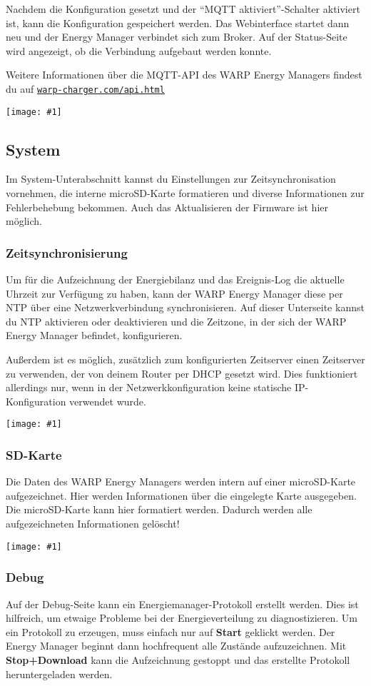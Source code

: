 \documentclass[a4paper,10pt]{article}
\newcommand{\gfx}[1]{\texttt{[image: \#1]}}
\newcommand\rurl[2]{%
  \href{#1}{\nolinkurl{#2}}%
}
\begin{document}
\begin{multicols*}{2}
	Nachdem die Konfiguration gesetzt und der \enquote{MQTT aktiviert}-Schalter aktiviert ist, kann die Konfiguration gespeichert werden.
	Das Webinterface startet dann neu und der Energy Manager verbindet sich zum Broker.
	Auf der Status-Seite wird angezeigt, ob die Verbindung aufgebaut werden konnte.

	Weitere Informationen über die MQTT-API des WARP Energy Managers findest du auf \rurl{https://warp-charger.com/api.html}{warp-charger.com/api.html}

	\gfx{./img/resized/web_mqtt}

	\subsection{System}
	Im System-Unterabschnitt kannst du Einstellungen zur Zeitsynchronisation
	vornehmen, die interne microSD-Karte formatieren und diverse Informationen zur Fehlerbehebung
	bekommen. Auch das Aktualisieren der Firmware ist hier möglich.

	\subsubsection{Zeitsynchronisierung}\label{ntp}
	Um für die Aufzeichnung der Energiebilanz und das Ereignis-Log die aktuelle Uhrzeit zur
	Verfügung zu haben, kann der WARP Energy Manager diese per NTP über
	eine Netzwerkverbindung synchronisieren. Auf dieser Unterseite kannst du NTP aktivieren oder deaktivieren und die Zeitzone, in der sich der WARP Energy Manager befindet, konfigurieren.

	Außerdem ist es möglich, zusätzlich zum konfigurierten Zeitserver einen Zeitserver zu verwenden, der von deinem Router per DHCP gesetzt wird. Dies funktioniert allerdings nur,
	wenn in der Netzwerkkonfiguration keine statische IP-Konfiguration verwendet wurde.

	\gfx{./img/resized/web_ntp}

	\subsubsection{SD-Karte}
	Die Daten des WARP Energy Managers werden intern auf einer microSD-Karte
	aufgezeichnet. Hier werden Informationen über die eingelegte Karte ausgegeben. Die microSD-Karte kann
	hier formatiert werden. Dadurch werden alle aufgezeichneten Informationen gelöscht!

	\gfx{./img/resized/web_em_sdcard}

	\subsubsection{Debug}
	Auf der Debug-Seite kann ein Energiemanager-Protokoll erstellt werden. Dies
	ist hilfreich, um etwaige Probleme bei der Energieverteilung zu diagnostizieren. Um
	ein Protokoll zu erzeugen, muss einfach nur auf \textbf{Start} geklickt
	werden. Der Energy Manager beginnt dann hochfrequent alle Zustände
	aufzuzeichnen. Mit \textbf{Stop+Download} kann die Aufzeichnung gestoppt und
	das erstellte Protokoll heruntergeladen werden.


\end{multicols*}
\end{document}
